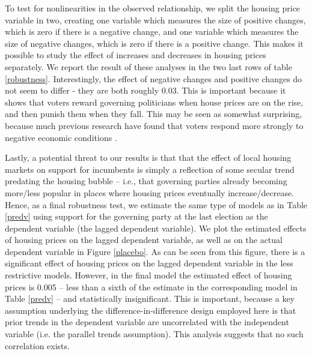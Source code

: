 \documentclass[12pt,a4paper]{article}
\begin{document}
	To test for nonlinearities in the observed relationship, we split the housing price variable in two, creating one variable which measures the size of positive changes, which is zero if there is a negative change, and one variable which measures the size of negative changes, which is zero if there is a positive change. This makes it possible to study the effect of increases and decreases in housing prices separately. We report the result of these analyses in the two last rows of table \ref{robustness}. Interestingly, the effect of negative changes and positive changes do not seem to differ - they are both roughly 0.03. This is important because it shows that voters reward governing politicians when house prices are on the rise, and then punish them when they fall. This may be seen as somewhat surprising, because much previous research have found that voters respond more strongly to negative economic conditions \citep[e.g.][]{bloom1975voter,headrick1991attention,soroka2014negativity}.
	
	Lastly, a potential threat to our results is that that the effect of local housing markets on support for incumbents is simply a reflection of some secular trend predating the housing bubble -- i.e., that governing parties already becoming more/less popular in places where housing prices eventually increase/decrease. Hence, as a final robustness test, we estimate the same type of models as in Table \ref{predv} using support for the governing party at the last election as the dependent variable (the lagged dependent variable). We plot the estimated effects of housing prices on the lagged dependent variable, as well as on the actual dependent variable in Figure \ref{placebo}. As can be seen from this figure, there is a significant effect of housing prices on the lagged dependent variable in the less restrictive models. However, in the final model the estimated effect of housing prices is 0.005 -- less than a sixth of the estimate in the corresponding model in Table \ref{predv} -- and statistically insignificant. This is important, because a key assumption underlying the difference-in-difference design employed here is that prior trends in the dependent variable are uncorrelated with the independent variable (i.e. the parallel trends assumption). This analysis suggests that no such correlation exists.
	
\end{document}
